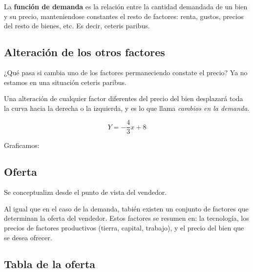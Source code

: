 La \textbf{función de demanda} es la relación entre la cantidad demandada de un bien y su precio,
manteniendose constantes el resto de factores: renta, gustos, precios del resto de bienes, etc.
Es decir,
ceteris paribus.

\subsection{Alteración de los otros factores}

¿Qué pasa si cambia uno de los factores permaneciendo constate el precio?
Ya no estamos en una situación ceteris paribus.

Una alteración de cualquier factor diferentes del precio del bien
desplazará toda la curva hacia la derecha o la izquierda,
y es lo que llama \textit{cambios en la demanda}.

\begin{equation*}
    Y = -\frac{4}{3}x + 8
\end{equation*}

Graficamos:

\begin{center}
\end{center}

\subsection{Oferta}

Se conceptualiza desde el punto de vista del vendedor.

Al igual que en el caso de la demanda,
tabién existen un conjunto de factores que determinan la oferta del vendedor.
Estos factores se resumen en: la tecnología, los precios de factores productivos (tierra, capital, trabajo),
y el precio del bien que se desea ofrecer.

\subsection{Tabla de la oferta}

